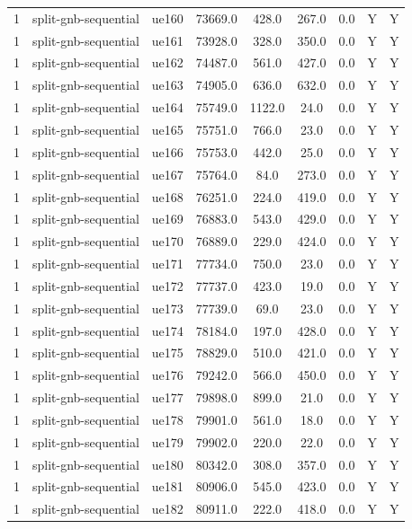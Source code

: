 \begin{table}[ht]
\begin{tabular}{|c|c|c|c|c|c|c|c|c|}
1 & split-gnb-sequential & ue160 & 73669.0 & 428.0 & 267.0 & 0.0 & Y & Y \\
1 & split-gnb-sequential & ue161 & 73928.0 & 328.0 & 350.0 & 0.0 & Y & Y \\
1 & split-gnb-sequential & ue162 & 74487.0 & 561.0 & 427.0 & 0.0 & Y & Y \\
1 & split-gnb-sequential & ue163 & 74905.0 & 636.0 & 632.0 & 0.0 & Y & Y \\
1 & split-gnb-sequential & ue164 & 75749.0 & 1122.0 & 24.0 & 0.0 & Y & Y \\
1 & split-gnb-sequential & ue165 & 75751.0 & 766.0 & 23.0 & 0.0 & Y & Y \\
1 & split-gnb-sequential & ue166 & 75753.0 & 442.0 & 25.0 & 0.0 & Y & Y \\
1 & split-gnb-sequential & ue167 & 75764.0 & 84.0 & 273.0 & 0.0 & Y & Y \\
1 & split-gnb-sequential & ue168 & 76251.0 & 224.0 & 419.0 & 0.0 & Y & Y \\
1 & split-gnb-sequential & ue169 & 76883.0 & 543.0 & 429.0 & 0.0 & Y & Y \\
1 & split-gnb-sequential & ue170 & 76889.0 & 229.0 & 424.0 & 0.0 & Y & Y \\
1 & split-gnb-sequential & ue171 & 77734.0 & 750.0 & 23.0 & 0.0 & Y & Y \\
1 & split-gnb-sequential & ue172 & 77737.0 & 423.0 & 19.0 & 0.0 & Y & Y \\
1 & split-gnb-sequential & ue173 & 77739.0 & 69.0 & 23.0 & 0.0 & Y & Y \\
1 & split-gnb-sequential & ue174 & 78184.0 & 197.0 & 428.0 & 0.0 & Y & Y \\
1 & split-gnb-sequential & ue175 & 78829.0 & 510.0 & 421.0 & 0.0 & Y & Y \\
1 & split-gnb-sequential & ue176 & 79242.0 & 566.0 & 450.0 & 0.0 & Y & Y \\
1 & split-gnb-sequential & ue177 & 79898.0 & 899.0 & 21.0 & 0.0 & Y & Y \\
1 & split-gnb-sequential & ue178 & 79901.0 & 561.0 & 18.0 & 0.0 & Y & Y \\
1 & split-gnb-sequential & ue179 & 79902.0 & 220.0 & 22.0 & 0.0 & Y & Y \\
1 & split-gnb-sequential & ue180 & 80342.0 & 308.0 & 357.0 & 0.0 & Y & Y \\
1 & split-gnb-sequential & ue181 & 80906.0 & 545.0 & 423.0 & 0.0 & Y & Y \\
1 & split-gnb-sequential & ue182 & 80911.0 & 222.0 & 418.0 & 0.0 & Y & Y \\

\end{tabular}
\end{table}
